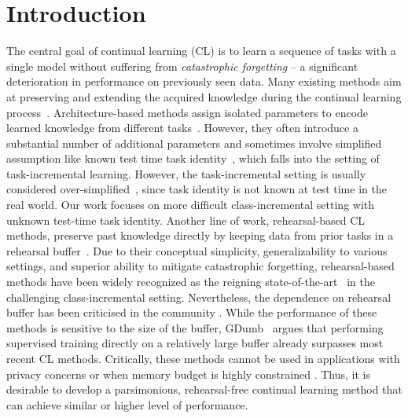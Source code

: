 \documentclass[runningheads]{llncs}
\begin{document}
\section{Introduction}
The central goal of continual learning (CL) is to learn a sequence of tasks with a single model without suffering from \emph{catastrophic forgetting} \cite{mccloskey1989catastrophic} -- a significant  deterioration in performance on previously seen data. Many existing methods aim at preserving and extending the acquired knowledge during the continual learning process~\cite{hadsell2020embracing,mai2021online}. Architecture-based methods assign isolated parameters to encode learned knowledge from different tasks~\cite{li2019learn,loo2020generalized,mallya2018packnet,serra2018overcoming,wang2020learn}. However, they often introduce a substantial number of additional parameters and sometimes involve simplified assumption like known test time task identity~\cite{ebrahimi2020adversarial,mallya2018packnet,mallya2018piggyback}, which falls into the setting of task-incremental learning. 
However, the task-incremental setting is usually considered over-simplified~\cite{buzzega2020dark,mai2021online,masana2020class}, since task identity is not known at test time in the real world. 
Our work focuses on more difficult class-incremental setting with unknown test-time task identity. 
Another line of work, rehearsal-based CL methods, preserve past knowledge directly by keeping data from prior tasks in a rehearsal buffer~\cite{buzzega2020dark,cha2021co2l,pham2021dualnet}. 
Due to their conceptual simplicity, generalizability to various settings, and superior ability to mitigate catastrophic forgetting, rehearsal-based methods have been widely recognized as the reigning state-of-the-art~\cite{chaudhry2020using,buzzega2020dark} in the challenging class-incremental setting. 
Nevertheless, the dependence on rehearsal buffer has been criticised in the community \cite{serra2018overcoming,hadsell2020embracing,prabhu2020gdumb,lomonaco2020rehearsal}. 
While the performance of these methods is sensitive to the size of the buffer, GDumb~\cite{prabhu2020gdumb} argues that performing supervised training directly on a relatively large buffer already surpasses most recent CL methods. 
Critically, these methods cannot be used in applications with privacy concerns \cite{shokri2015privacy} or when memory budget is highly constrained \cite{smith2021memory}. 
Thus, it is desirable to develop a parsimonious, rehearsal-free continual learning method that can achieve similar or higher level of performance.
\end{document}
